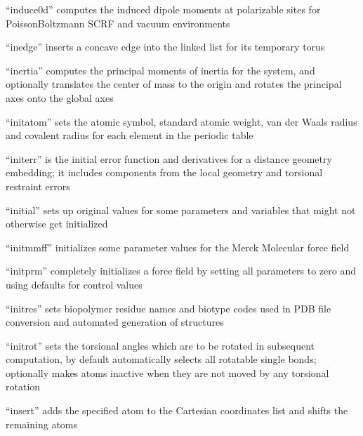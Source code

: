\documentclass[letterpaper,11pt,english]{sphinxmanual}
\begin{document}
“induce0d” computes the induced dipole moments at polarizable
sites for Poisson\sphinxhyphen{}Boltzmann SCRF and vacuum environments


“inedge” inserts a concave edge into the
linked list for its temporary torus


“inertia” computes the principal moments of inertia for the
system, and optionally translates the center of mass to the
origin and rotates the principal axes onto the global axes


“initatom” sets the atomic symbol, standard atomic weight,
van der Waals radius and covalent radius for each element in
the periodic table


“initerr” is the initial error function and derivatives for
a distance geometry embedding; it includes components from
the local geometry and torsional restraint errors


“initial” sets up original values for some parameters and
variables that might not otherwise get initialized


“initmmff” initializes some parameter values for the Merck
Molecular force field


“initprm” completely initializes a force field by setting all
parameters to zero and using defaults for control values


“initres” sets biopolymer residue names and biotype codes used
in PDB file conversion and automated generation of structures


“initrot” sets the torsional angles which are to be rotated
in subsequent computation, by default automatically selects
all rotatable single bonds; optionally makes atoms inactive
when they are not moved by any torsional rotation


“insert” adds the specified atom to the Cartesian
coordinates list and shifts the remaining atoms
\end{document}
